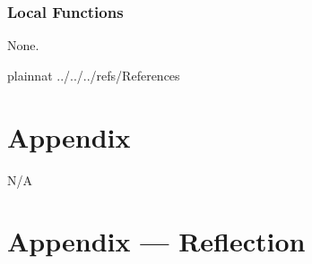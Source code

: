 \documentclass[12pt, titlepage]{article}
\begin{document}
\subsubsection{Local Functions}

None.

\newpage

 {plainnat}
 {../../../refs/References}

\newpage

\section{Appendix} \label{Appendix}

N/A

\newpage{}

\section*{Appendix --- Reflection}


\end{document}
